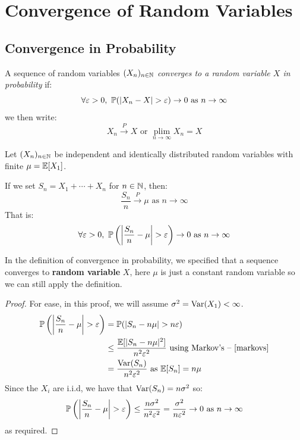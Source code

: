 \documentclass[../main.tex]{subfiles}
\begin{document}
\chapter{Convergence of Random Variables}
\section{Convergence in Probability}
\begin{definition}
  A sequence of random variables $(X_n)_{n \in \N}$ \textit{converges to a random variable $X$ in probability} if:
  \[
    \forall \varepsilon > 0,\ \P(|X_n - X| > \varepsilon) \to 0 \text{ as } n \to \infty
  \]
  we then write:
  \[
    X_n \xrightarrow{P} X \text{ or } \underset{n\to\infty}{\operatorname{plim}} X_n = X
  \]
\end{definition}
\begin{theorem}
  Let $(X_n)_{n \in \N}$ be independent and identically distributed random variables with finite $\mu = \E[X_1]$.

  If we set $S_n = X_1 + \cdots + X_n$ for $n \in \N$, then:
  \[
    \frac{S_n}{n} \xrightarrow{P} \mu \text{ as } n \to \infty
  \]
  That is:
  \[
    \forall \varepsilon > 0,\ \P\left(\abs{\frac{S_n}{n} - \mu} > \varepsilon\right) \to 0 \text{ as } n \to \infty
  \]
\end{theorem}
\begin{remark}
  In the definition of convergence in probability, we specified that a sequence converges to \textbf{random variable} $X$, here $\mu$ is just a constant random variable so we can still apply the definition.
\end{remark}
\begin{proof}
  For ease, in this proof, we will assume $\sigma^2 = \Var(X_1) < \infty$.
  \begin{align*}
    \P\left(\abs{\frac{S_n}{n} - \mu} > \varepsilon\right) &= \P(|S_n - n\mu| > n\varepsilon) \\
                                                           &\leq \frac{\E[|S_n - n\mu|^2]}{n^2 \varepsilon^2} \text{ using Markov's -- \cref{markovs}} \\
                                                           &= \frac{\Var(S_n)}{n^2 \varepsilon^2} \text{ as $\E[S_n] = n\mu$}
  \end{align*}
  Since the $X_i$ are i.i.d, we have that $\Var(S_n) = n\sigma^2$ so:
  \[
    \P\left(\abs{\frac{S_n}{n} - \mu} > \varepsilon\right) \leq \frac{n \sigma^2}{n^2 \varepsilon^2} = \frac{\sigma^2}{n \varepsilon^2} \to 0 \text{ as } n \to \infty
  \]
  as required.
\end{proof}
\end{document}
